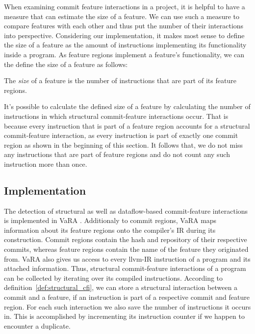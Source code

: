 When examining commit feature interactions in a project, it is helpful to have a measure that can estimate the size of a feature.
We can use such a measure to compare features with each other and thus put the number of their interactions into perspective.
Considering our implementation, it makes most sense to define the size of a feature as the amount of instructions implementing its functionality inside a program.
As feature regions implement a feature's functionality, we can the define the size of a feature as follows:
\begin{definition} \label{def:feature_size}
The \emph{size} of a feature is the number of instructions that are part of its feature regions.
\end{definition}
It's possible to calculate the defined size of a feature by calculating the number of instructions in which structural commit-feature interactions occur.
That is because every instruction that is part of a feature region accounts for a structural commit-feature interaction, as every instruction is part of exactly one commit region as shown in the beginning of this section.
It follows that, we do not miss any instructions that are part of feature regions and do not count any such instruction more than once. 

\subsection*{Implementation}\label{ch:implementation}

The detection of structural as well as dataflow-based commit-feature interactions is implemented in VaRA \cite{VaRA2023}.
Additionaly to commit regions, VaRA maps information about its feature regions onto the compiler's IR during its construction.
Commit regions contain the hash and repository of their respective commits, whereas feature regions contain the name of the feature they originated from.
VaRA also gives us access to every llvm-IR instruction of a program and its attached information.
Thus, structural commit-feature interactions of a program can be collected by iterating over its compiled instructions.
According to definition~\ref{def:structural_cfi}, we can store a structural interaction between a commit and a feature, if an instruction is part of a respective commit and feature region.
For each such interaction we also save the number of instructions it occurs in. 
This is accomplished by incrementing its instruction counter if we happen to encounter a duplicate. 

